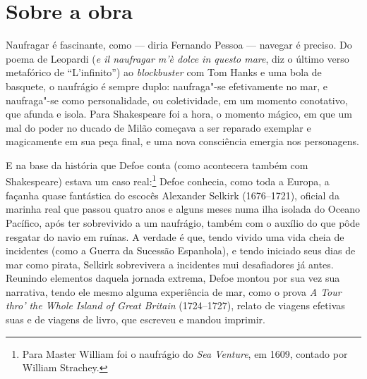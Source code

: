 \section{Sobre a obra}

Naufragar é fascinante, como --- diria Fernando Pessoa --- navegar é
preciso. Do poema de Leopardi (\emph{e il naufragar m'è dolce in questo
mare}, diz o último verso metafórico de ``L'infinito'') ao
\emph{blockbuster} com Tom Hanks e uma bola de basquete, o naufrágio é
sempre duplo: naufraga"-se efetivamente no mar, e naufraga"-se como
personalidade, ou coletividade, em um momento conotativo, que afunda e
isola. Para Shakespeare foi a hora, o momento mágico, em que um mal do
poder no ducado de Milão começava a ser reparado exemplar e magicamente
em sua peça final, e uma nova consciência emergia nos personagens.

E na base da história que Defoe conta (como acontecera também com
Shakespeare) estava um caso real:\footnote{Para Master William foi o
  naufrágio do \emph{Sea Venture}, em 1609, contado por William
  Strachey.} Defoe conhecia, como toda a Europa, a façanha quase
fantástica do escocês Alexander Selkirk (1676--1721), oficial da marinha
real que passou quatro anos e alguns meses numa ilha isolada do Oceano
Pacífico, após ter sobrevivido a um naufrágio, também com o auxílio do
que pôde resgatar do navio em ruínas. A verdade é que, tendo vivido uma
vida cheia de incidentes (como a Guerra da Sucessão Espanhola), e tendo
iniciado seus dias de mar como pirata, Selkirk sobrevivera a incidentes
mui desafiadores já antes. Reunindo elementos daquela jornada extrema,
Defoe montou por sua vez sua narrativa, tendo ele mesmo alguma
experiência de mar, como o prova \emph{A Tour thro' the Whole}
\emph{Island of Great Britain} (1724--1727), relato de viagens efetivas
suas e de viagens de livro, que escreveu e mandou imprimir.

